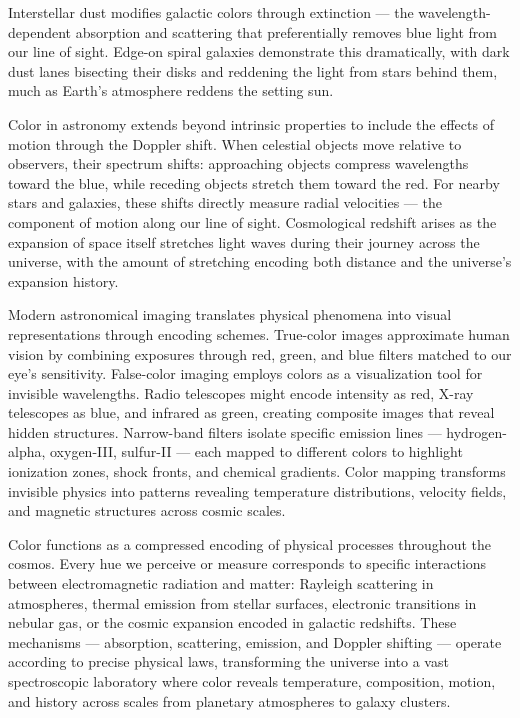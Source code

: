 Interstellar dust modifies galactic colors through extinction — the wavelength-dependent absorption and scattering that preferentially removes blue light from our line of sight. Edge-on spiral galaxies demonstrate this dramatically, with dark dust lanes bisecting their disks and reddening the light from stars behind them, much as Earth's atmosphere reddens the setting sun.

Color in astronomy extends beyond intrinsic properties to include the effects of motion through the Doppler shift. When celestial objects move relative to observers, their spectrum shifts: approaching objects compress wavelengths toward the blue, while receding objects stretch them toward the red. For nearby stars and galaxies, these shifts directly measure radial velocities — the component of motion along our line of sight. Cosmological redshift arises as the expansion of space itself stretches light waves during their journey across the universe, with the amount of stretching encoding both distance and the universe's expansion history.

Modern astronomical imaging translates physical phenomena into visual representations through encoding schemes. True-color images approximate human vision by combining exposures through red, green, and blue filters matched to our eye's sensitivity. False-color imaging employs colors as a visualization tool for invisible wavelengths. Radio telescopes might encode intensity as red, X-ray telescopes as blue, and infrared as green, creating composite images that reveal hidden structures. Narrow-band filters isolate specific emission lines — hydrogen-alpha, oxygen-III, sulfur-II — each mapped to different colors to highlight ionization zones, shock fronts, and chemical gradients. Color mapping transforms invisible physics into patterns revealing temperature distributions, velocity fields, and magnetic structures across cosmic scales.

Color functions as a compressed encoding of physical processes throughout the cosmos. Every hue we perceive or measure corresponds to specific interactions between electromagnetic radiation and matter: Rayleigh scattering in atmospheres, thermal emission from stellar surfaces, electronic transitions in nebular gas, or the cosmic expansion encoded in galactic redshifts. These mechanisms — absorption, scattering, emission, and Doppler shifting — operate according to precise physical laws, transforming the universe into a vast spectroscopic laboratory where color reveals temperature, composition, motion, and history across scales from planetary atmospheres to galaxy clusters.

